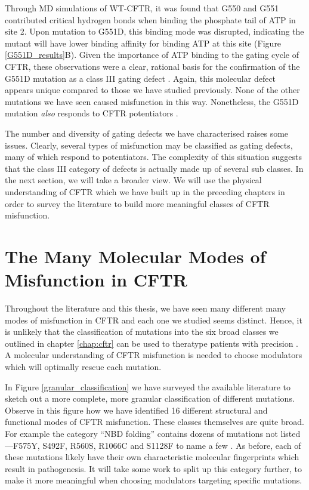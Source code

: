 Through MD simulations of WT-CFTR, it was found that G550 and G551 contributed critical hydrogen bonds when binding the phosphate tail of ATP in site 2. Upon mutation to G551D, this binding mode was disrupted, indicating the mutant will have lower binding affinity for binding ATP at this site (Figure \ref{G551D_results}B). Given the importance of ATP binding to the gating cycle of CFTR, these observations were a clear, rational basis for the confirmation of the G551D mutation as a class III gating defect \cite{bompadre2008}. Again, this molecular defect appears unique compared to those we have studied previously. None of the other mutations we have seen caused misfunction in this way. Nonetheless, the G551D mutation \textit{also} responds to CFTR potentiators \cite{vangoor2009,wong2022a,kalydeco_FDA_approval}. 

The number and diversity of gating defects we have characterised raises some issues. Clearly, several types of misfunction may be classified as gating defects, many of which respond to potentiators. The complexity of this situation suggests that the class III category of defects is actually made up of several sub classes. In the next section, we will take a broader view. We will use the physical understanding of CFTR which we have built up in the preceding chapters in order to survey the literature to build more meaningful classes of CFTR misfunction.

\section{The Many Molecular Modes of Misfunction in CFTR}

Throughout the literature and this thesis, we have seen many different many modes of misfunction in CFTR and each one we studied seems distinct. Hence, it is unlikely that the classification of mutations into the six broad classes we outlined in chapter \ref{chap:cftr} can be used to theratype patients with precision \cite{veit2016}. A molecular understanding of CFTR misfunction is needed to choose modulators which will optimally rescue each mutation.

In Figure \ref{granular_classification} we have surveyed the available literature to sketch out a more complete, more granular classification of different mutations. Observe in this figure how we have identified 16 different structural and functional modes of CFTR misfunction. These classes themselves are quite broad. For example the category ``NBD folding'' contains dozens of mutations not listed---F575Y, S492F, R560S, R1066C and S1128F to name a few \cite{awatade2019, lopes-pacheco2016, casals1997, cotten1996, penmatsa2009}. As before, each of these mutations likely have their own characteristic molecular fingerprints which result in pathogenesis. It will take some work to split up this category further, to make it more meaningful when choosing modulators targeting specific mutations.

